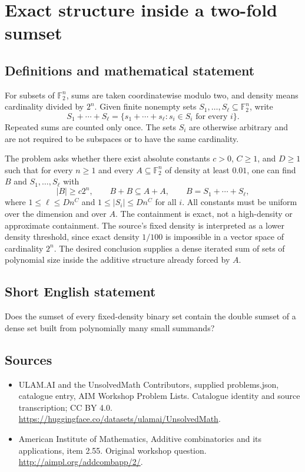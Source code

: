 \documentclass[11pt,a4paper]{article}
\begin{document}
\section*{Exact structure inside a two-fold sumset}\label{statement}

\subsection{Definitions and mathematical statement}
For subsets of $\mathbb F_2^n$, sums are taken coordinatewise modulo two, and density means cardinality divided by $2^n$.
Given finite nonempty sets $S_1,\ldots,S_\ell\subseteq\mathbb F_2^n$, write
\[
 S_1+\cdots+S_\ell
 =\{s_1+\cdots+s_\ell:s_i\in S_i\text{ for every }i\}.
\]
Repeated sums are counted only once.
The sets $S_i$ are otherwise arbitrary and are not required to be subspaces or to have the same cardinality.

The problem asks whether there exist absolute constants $c>0$, $C\geq1$, and $D\geq1$ such that for every $n\geq1$ and every $A\subseteq\mathbb F_2^n$ of density at least $0.01$, one can find $B$ and $S_1,\ldots,S_\ell$ with
\[
 |B|\geq c2^n,\qquad B+B\subseteq A+A,\qquad
 B=S_1+\cdots+S_\ell,
\]
where $1\leq\ell\leq Dn^C$ and $1\leq|S_i|\leq Dn^C$ for all $i$.
All constants must be uniform over the dimension and over $A$.
The containment is exact, not a high-density or approximate containment.
The source's fixed density is interpreted as a lower density threshold, since exact density $1/100$ is impossible in a vector space of cardinality $2^n$.
The desired conclusion supplies a dense iterated sum of sets of polynomial size inside the additive structure already forced by $A$.
\subsection{Short English statement}
Does the sumset of every fixed-density binary set contain the double sumset of a dense set built from polynomially many small summands?
\subsection{Sources}
\begin{itemize}
\item[S1] ULAM.AI and the UnsolvedMath Contributors, supplied problems.json, catalogue entry, AIM Workshop Problem Lists. Catalogue identity and source transcription; CC BY 4.0.
\url{https://huggingface.co/datasets/ulamai/UnsolvedMath}.
\item[S2] American Institute of Mathematics, Additive combinatorics and its applications, item 2.55. Original workshop question.
\url{http://aimpl.org/addcombapp/2/}.
\end{itemize}
\end{document}
